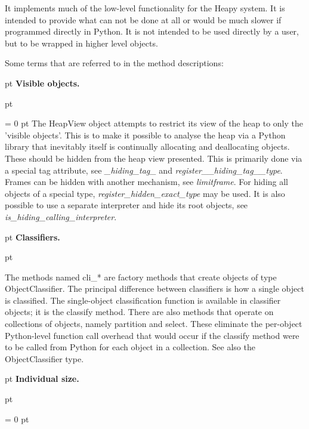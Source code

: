 {{{ \par}
{\par 
It implements much of the low-level functionality for the Heapy
system. It is intended to provide what can not be done at all or would
be much slower if programmed directly in Python. It is not intended to
be used directly by a user, but to be wrapped in higher level objects.
 \par}
{\par 
Some terms that are referred to in the method descriptions:
 \par}
{\par \pagebreak[2]  pt \noindent
{\large {\bf  Visible objects.\/}}\par {} pt
} \noindent
{\par \parindent = 0 pt 
The HeapView object attempts to restrict its view of the heap to only
the 'visible objects'. This is to make it possible to analyse the heap
via a Python library that inevitably itself is continually allocating
and deallocating objects. These should be hidden from the heap view
presented. This is primarily done via a special tag attribute, see  {\em {\_}hiding{\_}tag{\_}\/} and  {\em register{\_}{\_}hiding{\_}tag{\_}{\_}type\/}. Frames can be hidden
with another mechanism, see  {\em limitframe\/}. For hiding all objects of a special type,  {\em register{\_}hidden{\_}exact{\_}type\/} may be used. It is also
possible to use a separate interpreter and hide its root objects, see  {\em is{\_}hiding{\_}calling{\_}interpreter\/}.
 \par}
{\par \pagebreak[2]  pt \noindent
{\large {\bf  Classifiers.\/}}\par {} pt
} \noindent
The methods named cli{\_}* are factory methods that create objects of
type ObjectClassifier. The principal difference between classifiers is
how a single object is classified. The single-object classification
function is available in classifier objects; it is the classify
method. There are also methods that operate on collections of objects,
namely partition and select. These eliminate the per-object
Python-level function call overhead that would occur if the classify
method were to be called from Python for each object in a collection.
See also the ObjectClassifier type.
{\par \pagebreak[2]  pt \noindent
{\large {\bf  Individual size.\/}}\par {} pt
} \noindent
{\par \parindent = 0 pt 
}}}
